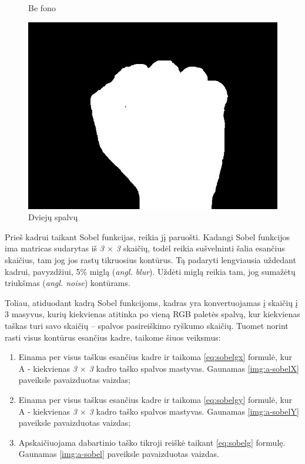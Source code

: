 \documentclass{VUMIFInfKursinis}
\begin{document}
\begin{figure}[H]
\begin{minipage}{.3\textwidth}
		\caption{Be fono}
		\label{img:a-black-sign}
	\end{minipage}\hspace{\fill}%
	\begin{minipage}{.3\textwidth}
		\centering
		\includegraphics[width=.8\linewidth]{img/A-white}
		\caption{Dviejų spalvų}
		\label{img:a-white-sign}
	\end{minipage}
\end{figure}

Prieš kadrui taikant Sobel funkcijas, reikia jį paruošti. Kadangi Sobel funkcijos ima matricas sudarytas iš \textit{3 $\times$ 3} skaičių, todėl reikia sušvelninti šalia esančius skaičius, tam jog jos rastų tikruosius kontūrus. Tą padaryti lengviausia uždedant kadrui, pavyzdžiui, 5\% miglą (\textit{angl. blur}). Uždėti miglą reikia tam, jog sumažėtų triukšmas (\textit{angl. noise}) kontūrams. 

Toliau, atiduodant kadrą Sobel funkcijoms, kadras yra konvertuojamas į skaičių į 3 masyvus, kurių kiekvienas atitinka po vieną RGB paletės spalvą, kur kiekvienas taškas turi savo skaičių – spalvos pasireiškimo ryškumo skaičių. Tuomet norint rasti visus kontūrus esančius kadre, taikome šiuos veiksmus:

\begin{enumerate}
	\item Einama per visus taškus esančius kadre ir taikoma \ref{eq:sobelgx} formulė, kur A - kiekvienas \textit{3 $\times$ 3} kadro taško spalvos mastyvas. Gaunamas \ref{img:a-sobelX} paveiksle pavaizduotas vaizdas;
	\item Einama per visus taškus esančius kadre ir taikoma \ref{eq:sobelgy} formulė, kur A - kiekvienas \textit{3 $\times$ 3} kadro taško spalvos mastyvas. Gaunamas \ref{img:a-sobelY} paveiksle pavaizduotas vaizdas;
	\item Apskaičiuojama dabartinio taško tikroji reiškė taikant \ref{eq:sobelg} formulę. Gaunamas \ref{img:a-sobel} paveiksle pavaizduotas vaizdas.
\end{enumerate}
\end{document}
